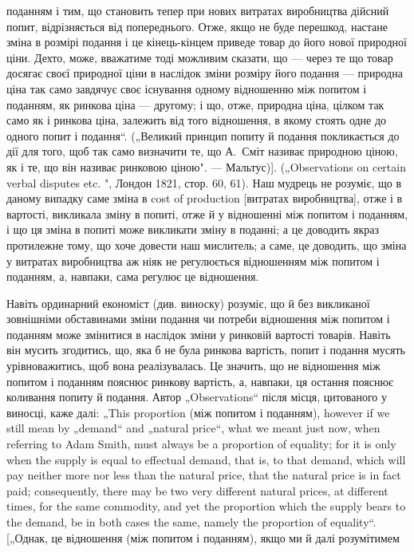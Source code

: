 {поданням і тим, що становить тепер при нових витратах виробництва дійсний
попит, відрізняється від попереднього. Отже, якщо не буде перешкод,
настане зміна в розмірі подання і це кінець-кінцем приведе товар до його
нової природної ціни. Дехто, може, вважатиме тоді можливим сказати, що —
через те що товар досягає своєї природної ціни в наслідок зміни розміру
його подання — природна ціна так само завдячує своє існування одному відношенню
між попитом і поданням, як ринкова ціна — другому; і що, отже,
природна ціна, цілком так само як і ринкова ціна, залежить від того відношення,
в якому стоять одне до одного попит і подання“. („Великий принцип
попиту й подання покликається до дії для того, щоб так само визначити
те, що А.~Сміт називає природною ціною, як і те, що він називає ринковою
ціною". — Мальтус)]. („Observations on certain verbal disputes etc. ", Лондон 1821,
стор. 60, 61). Наш мудрець не розуміє, що в даному випадку саме зміна в cost
of production [витратах виробництва], отже і в вартості, викликала зміну в попиті,
отже й у відношенні між попитом і поданням, і що ця зміна в попиті
може викликати зміну в поданні; а це доводить якраз протилежне тому, що
хоче довести наш мислитель; а саме, це доводить, що зміна у витратах виробництва
аж ніяк не регулюється відношенням між попитом і поданням, а, навпаки,
сама регулює це відношення.}

Навіть ординарний економіст (див. виноску) розуміє, що
й без викликаної зовнішніми обставинами зміни подання чи потреби
відношення між попитом і поданням може змінитися
в наслідок зміни у ринковій вартості товарів. Навіть він мусить
згодитись, що, яка б не була ринкова вартість, попит і подання
мусять урівноважитись, щоб вона реалізувалась. Це значить,
що не відношення між попитом і поданням пояснює ринкову
вартість, а, навпаки, ця остання пояснює коливання попиту
й подання. Автор „Observations“ після місця, цитованого у виносці,
каже далі: „This proportion (між попитом і поданням),
however if we still mean by „demand“ and „natural price“, what
we meant just now, when referring to Adam Smith, must always
be a proportion of equality; for it is only when the supply is equal
to effectual demand, that is, to that demand, which will pay neither
more nor less than the natural price, that the natural price is in
fact paid; consequently, there may be two very different natural
prices, at different times, for the same commodity, and yet the
proportion which the supply bears to the demand, be in both cases
the same, namely the proportion of equality“. [„Однак, це відношення
(між попитом і поданням), якщо ми й далі розумітимем
\parbreak{}  %
